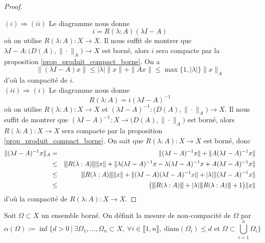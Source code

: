 \begin{proof}
\begin{center}
\begin{tikzpicture}[node distance=3cm, auto]
    \end{tikzpicture}
    \end{center}
    $\boxed{(i) \Longrightarrow (ii)}$ Le diagramme nous donne 
    \begin{equation*}
        i = R(\lambda : A)(\lambda I -A)
    \end{equation*}
    où on utilise $R(\lambda : A):X \rightarrow X$. Il nous suffit de montrer que $\lambda I - A : \big(D(A),\|\cdot\|_A\big) \rightarrow X$ est borné, alors $i$ sera compacte par la proposition \ref{prop_produit_compact_borne}. On a 
    \begin{equation*}
        \|(\lambda I - A)x\| \leq |\lambda| \|x\| + \|Ax\| \leq \max\{1,|\lambda|\}\|x\|_A
    \end{equation*}
    d'où la compacité de $i$.
    \\
    $\boxed{(ii) \Longrightarrow (i)}$ Le diagramme nous donne 
    \begin{equation*}
        R(\lambda : A) = i (\lambda I-A)^{-1}
    \end{equation*}
    où on utilise $R(\lambda : A) : X \rightarrow X$ et $(\lambda I-A)^{-1}: \big(D(A),\|\cdot\|_A\big) \rightarrow X$. Il nous suffit de montrer que $(\lambda I - A)^{-1} : X \rightarrow \big(D(A),\|\cdot\|_A\big)$ est borné, alors $R(\lambda : A):X \rightarrow X$ sera compacte par la proposition \ref{prop_produit_compact_borne}. On sait que $R(\lambda : A) : X \rightarrow X$ est borné, donc 
    \begin{eqnarray*}
        \|(\lambda I - A)^{-1}x\|_A &=& \|(\lambda I-A)^{-1}x\|+\|A(\lambda I - A)^{-1}x\| \\
        &\leq& {\left\vert\kern-0.25ex\left\vert \kern-0.25ex\left\vert R(\lambda : A) \right\vert\kern-0.25ex\right\vert\kern-0.25ex\right\vert}\|x\| + \|\lambda(\lambda I - A)^{-1}x-\lambda(\lambda I-A)^{-1}x+A(\lambda I - A)^{-1}x\| \\
        &\leq& {\left\vert\kern-0.25ex\left\vert \kern-0.25ex\left\vert R(\lambda :A) \right\vert\kern-0.25ex\right\vert\kern-0.25ex\right\vert}\|x\|+\|(\lambda I -A)(\lambda I - A)^{-1}x\| + |\lambda|\|(\lambda I -A)^{-1}x\| \\
        &\leq& \big({\left\vert\kern-0.25ex\left\vert \kern-0.25ex\left\vert R(\lambda : A) \right\vert\kern-0.25ex\right\vert\kern-0.25ex\right\vert}+|\lambda|{\left\vert\kern-0.25ex\left\vert \kern-0.25ex\left\vert R(\lambda :A) \right\vert\kern-0.25ex\right\vert\kern-0.25ex\right\vert}+1\big)\|x\|
    \end{eqnarray*}
    d'où la compacité de $R(\lambda : A):X\rightarrow X$.
\end{proof}

\begin{definition}
    Soit $\Omega \subset X$ un ensemble borné. On définit la \textcolor{astral}{mesure de non-compacité de $\Omega$} par 
    \begin{equation*}
        \alpha(\Omega) := \inf\Big\{ d>0 \ |\ \exists \Omega_1,\dots,\Omega_n \subset X, \ \forall i \in \llbracket 1,n\rrbracket, \ \mathrm{diam}(\Omega_i) \leq d \text{ et } \Omega \subset \bigcup_{i=1}^n \Omega_i \Big\}
    \end{equation*}
\end{definition}

